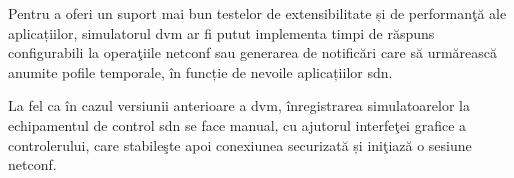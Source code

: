 Pentru a oferi un suport mai bun testelor de extensibilitate și de performanţă ale aplicațiilor, simulatorul \gls{dvm} ar fi putut implementa timpi de răspuns configurabili la operaţiile \gls{netconf} sau generarea de notificări care să urmărească anumite pofile temporale, în funcție de nevoile aplicațiilor \gls{sdn}.

La fel ca în cazul versiunii anterioare a \gls{dvm}, înregistrarea simulatoarelor la echipamentul de control \gls{sdn} se face manual, cu ajutorul interfeţei grafice a controlerului, care stabileşte apoi conexiunea securizată și iniţiază o sesiune \gls{netconf}.